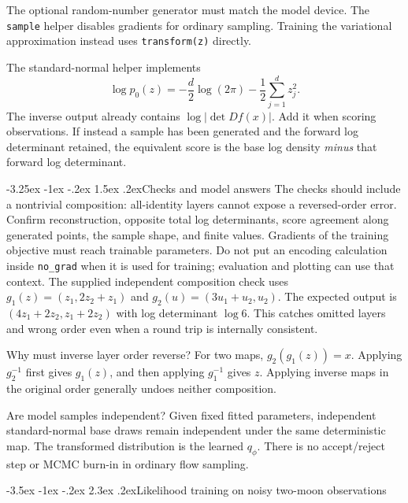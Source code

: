 \documentclass[11pt,a4paper]{article}
\makeatletter
\renewcommand\section{\@startsection{section}{1}{\z@}%
  {-3.5ex \@plus -1ex \@minus -.2ex}%
  {2.3ex \@plus .2ex}{\normalfont\Large}}
\renewcommand\subsection{\@startsection{subsection}{2}{\z@}%
  {-3.25ex \@plus -1ex \@minus -.2ex}%
  {1.5ex \@plus .2ex}{\normalfont\large}}
\makeatother
\begin{document}
The optional random-number generator must match the model device. The
\texttt{sample} helper disables gradients for ordinary sampling. Training the
variational approximation instead uses \texttt{transform(z)} directly.

The standard-normal helper implements
\[
 \log p_0(z)=-\frac d2\log(2\pi)-\frac12\sum_{j=1}^d z_j^2.
\]
The inverse output already contains $\log|\det Df(x)|$. Add it when scoring
observations. If instead a sample has been generated and the forward
log determinant retained, the equivalent score is the base log density
\emph{minus} that forward log determinant.

\subsection{Checks and model answers}
The checks should include a nontrivial composition: all-identity layers cannot
expose a reversed-order error. Confirm reconstruction, opposite total log
determinants, score agreement along generated points, the sample shape, and
finite values. Gradients of the training objective must reach trainable
parameters. Do not put an encoding calculation inside \texttt{no\_grad} when
it is used for training; evaluation and plotting can use that context.
The supplied independent composition check uses
$g_1(z)=(z_1,2z_2+z_1)$ and $g_2(u)=(3u_1+u_2,u_2)$.
The expected output is $(4z_1+2z_2,z_1+2z_2)$ with log determinant $\log 6$.
This catches omitted layers and wrong order even when a round trip is
internally consistent.

Why must inverse layer order reverse? For two maps,
$g_2(g_1(z))=x$. Applying $g_2^{-1}$ first gives $g_1(z)$, and then applying
$g_1^{-1}$ gives $z$. Applying inverse maps in the original order generally
undoes neither composition.

Are model samples independent? Given fixed fitted parameters,
independent standard-normal base draws remain independent under the same
deterministic map. The transformed distribution is the learned $q_\phi$.
There is no accept/reject step or MCMC burn-in in ordinary flow sampling.

\section{Likelihood training on noisy two-moon observations}
\end{document}
